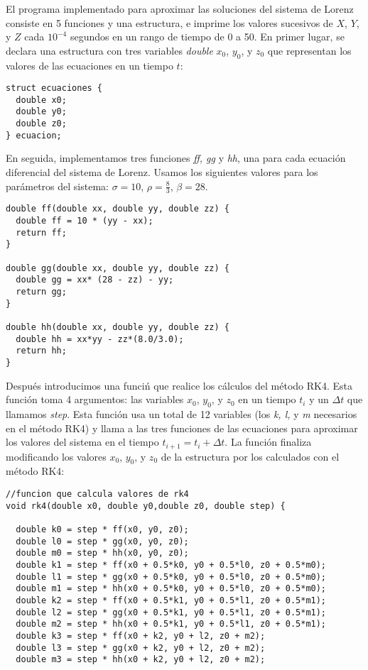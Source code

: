 \documentclass[letterpaper, 12pt]{article}
\begin{document}
{\justify
El programa implementado para aproximar las soluciones del sistema de Lorenz consiste en 5 funciones y una estructura, e imprime los valores sucesivos de $X$, $Y$, y $Z$ cada $10^{-4}$ segundos en un rango de tiempo de 0 a 50. En primer lugar, se declara una estructura con tres variables \textit{double} $x_0$, $y_0$, y $z_0$ que representan los valores de las ecuaciones en un tiempo $t$:

\begin{lstlisting}
struct ecuaciones {
  double x0;
  double y0;
  double z0;
} ecuacion;
\end{lstlisting}
 En seguida, implementamos tres funciones \textit{ff, gg} y \textit{hh}, una para cada ecuaci\'on diferencial del sistema de Lorenz. Usamos los siguientes valores para los par\'ametros del sistema: $\sigma = 10$, $\rho = \frac{8}{3}$, $\beta = 28$. 
\begin{lstlisting}
double ff(double xx, double yy, double zz) {
  double ff = 10 * (yy - xx);
  return ff;
}

double gg(double xx, double yy, double zz) {
  double gg = xx* (28 - zz) - yy;
  return gg;
}

double hh(double xx, double yy, double zz) {
  double hh = xx*yy - zz*(8.0/3.0);
  return hh;
}
\end{lstlisting}

Despu\'es introducimos una funci\'n que realice los c\'alculos del m\'etodo RK4. Esta funci\'on toma 4 argumentos: las variables $x_0$, $y_0$, y $z_0$ en un tiempo $t_i$ y un $\Delta t $ que llamamos \textit{step}. Esta funci\'on usa un total de 12 variables (los \textit{k, l,} y \textit{m} necesarios en el m\'etodo RK4) y llama a las tres funciones de las ecuaciones para aproximar los valores del sistema en el tiempo $t_{i+1} = t_i + \Delta t$. La funci\'on finaliza modificando los valores $x_0$, $y_0$, y $z_0$ de la estructura por los calculados con el m\'etodo RK4:
\begin{lstlisting}
//funcion que calcula valores de rk4
void rk4(double x0, double y0,double z0, double step) {

  double k0 = step * ff(x0, y0, z0);
  double l0 = step * gg(x0, y0, z0);
  double m0 = step * hh(x0, y0, z0);
  double k1 = step * ff(x0 + 0.5*k0, y0 + 0.5*l0, z0 + 0.5*m0);
  double l1 = step * gg(x0 + 0.5*k0, y0 + 0.5*l0, z0 + 0.5*m0);
  double m1 = step * hh(x0 + 0.5*k0, y0 + 0.5*l0, z0 + 0.5*m0);
  double k2 = step * ff(x0 + 0.5*k1, y0 + 0.5*l1, z0 + 0.5*m1);
  double l2 = step * gg(x0 + 0.5*k1, y0 + 0.5*l1, z0 + 0.5*m1);
  double m2 = step * hh(x0 + 0.5*k1, y0 + 0.5*l1, z0 + 0.5*m1);
  double k3 = step * ff(x0 + k2, y0 + l2, z0 + m2);
  double l3 = step * gg(x0 + k2, y0 + l2, z0 + m2);
  double m3 = step * hh(x0 + k2, y0 + l2, z0 + m2);


\end{lstlisting}}
\end{document}
